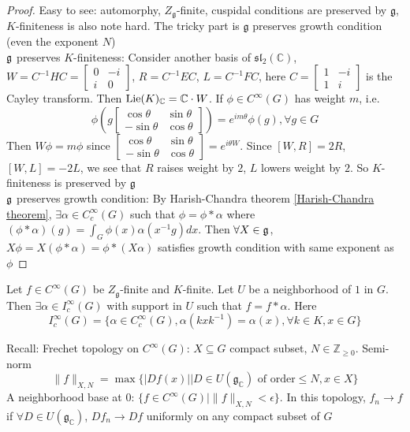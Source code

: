 \documentclass[main]{subfiles}
\begin{document}
\begin{proof}
Easy to see: automorphy, $Z_{\mathfrak g}$-finite, cuspidal conditions are preserved by $\mathfrak g$, $K$-finiteness is also note hard. The tricky part is $\mathfrak g$ preserves growth condition (even the exponent $N$) \\
$\frak g$ preserves $K$-finiteness: Consider another basis of $\mathfrak{sl}_2(\mathbb C)$, $W=C^{-1}HC=\begin{bmatrix}
0&-i\\
i&0
\end{bmatrix}$, $R=C^{-1}EC$, $L=C^{-1}FC$, here $C=\begin{bmatrix}
1&-i\\
1&i
\end{bmatrix}$ is the Cayley transform. Then $\operatorname{Lie}(K)_{\mathbb C}=\mathbb C\cdot W$. If $\phi\in C^\infty(G)$ has weight $m$, i.e.
\[\phi\left(g\begin{bmatrix}
\cos\theta&\sin\theta\\
-\sin\theta&\cos\theta
\end{bmatrix}\right)=e^{im\theta}\phi(g),\forall g\in G\]
Then $W\phi=m\phi$ since $\begin{bmatrix}
\cos\theta&\sin\theta\\
-\sin\theta&\cos\theta
\end{bmatrix}=e^{i\theta W}$. Since $[W,R]=2R$, $[W,L]=-2L$, we see that $R$ raises weight by $2$, $L$ lowers weight by $2$. So $K$-finiteness is preserved by $\mathfrak g$ \\
$\frak g$ preserves growth condition: By Harish-Chandra theorem \ref{Harish-Chandra theorem}, $\exists\alpha\in C_c^\infty(G)$ such that $\phi=\phi*\alpha$ where $(\phi*\alpha)(g)=\int_G\phi(x)\alpha(x^{-1}g)dx$. Then $\forall X\in\frak g$, $X\phi=X(\phi*\alpha)=\phi*(X\alpha)$ satisfies growth condition with same exponent as $\phi$
\end{proof}

\begin{theorem}\label{Harish-Chandra theorem}
Let $f\in C^\infty(G)$ be $Z_{\mathfrak g}$-finite and $K$-finite. Let $U$ be a neighborhood of $1$ in $G$. Then $\exists\alpha\in I^\infty_c(G)$ with support in $U$ such that $f=f*\alpha$. Here \[I^\infty_c(G)=\{\alpha\in C^\infty_c(G),\alpha(kxk^{-1})=\alpha(x),\forall k\in K,x\in G\}\]
\end{theorem}

Recall: Frechet topology on $C^\infty(G)$: $X\subseteq G$ compact subset, $N\in\mathbb Z_{\geq0}$. Semi-norm
\[\|f\|_{X,N}=\max\{|Df(x)||D\in U(\mathfrak g_{\mathbb C})\text{ of order}\leq N, x\in X\}\]
A neighborhood base at $0$: $\{f\in C^\infty(G)|\|f\|_{X,N}<\epsilon\}$. In this topology, $f_n\to f$ if $\forall D\in U(\mathfrak g_{\mathbb C})$, $Df_n\to Df$ uniformly on any compact subset of $G$
\end{document}
